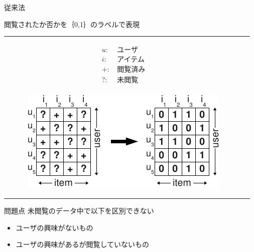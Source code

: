 \documentclass[aspectratio=43, dvipdfmx, 11pt]{beamer} %
\begin{document}
\begin{frame}{従来法}

    閲覧されたか否かを｛0,1｝のラベルで表現
    \begin{tabular}{ll}
        \begin{minipage}{0.4\hsize}
        \begin{flushleft}
        \begin{equation*}
        \begin{aligned}
            u \colon & \, \text{ユーザ}\\
            i \colon & \, \text{アイテム}\\
            + \colon & \, \text{閲覧済み}\\
            ? \colon & \, \text{未閲覧}\\
        \end{aligned}
        \end{equation*}
    \end{flushleft}
    \end{minipage}
    \begin{minipage}{0.6\hsize}
        \begin{figure}[H]
        \begin{flushleft}
        \vspace{1zh}
        \includegraphics[pagebox=cropbox,clip]{BPR-crop.pdf}
    \end{flushleft}
        \end{figure}
    \end{minipage}
    \end{tabular}
    \begin{alertblock}{問題点}
    未閲覧のデータ中で以下を区別できない
        \begin{itemize}
            \item ユーザの興味がないもの
            \item ユーザの興味があるが閲覧していないもの
        \end{itemize}
    \end{alertblock}
\end{frame}
\end{document}
